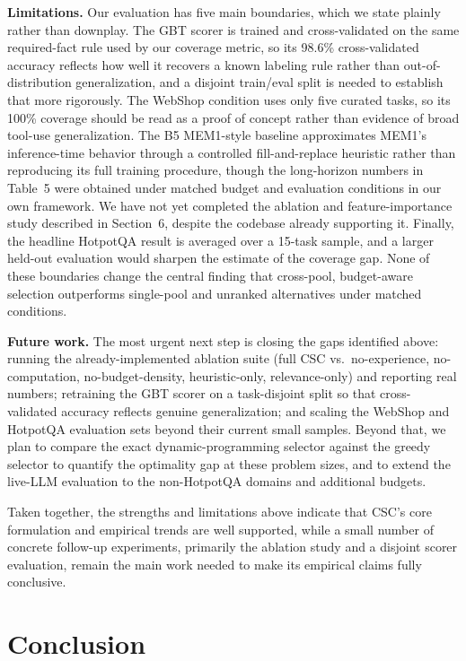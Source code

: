 \documentclass{article}
\begin{document}
\textbf{Limitations.} Our evaluation has five main boundaries, which we state plainly rather than downplay. The GBT scorer is trained and cross-validated on the same required-fact rule used by our coverage metric, so its 98.6\% cross-validated accuracy reflects how well it recovers a known labeling rule rather than out-of-distribution generalization, and a disjoint train/eval split is needed to establish that more rigorously. The WebShop condition uses only five curated tasks, so its 100\% coverage should be read as a proof of concept rather than evidence of broad tool-use generalization. The B5 MEM1-style baseline approximates MEM1's inference-time behavior through a controlled fill-and-replace heuristic rather than reproducing its full training procedure, though the long-horizon numbers in Table~5 were obtained under matched budget and evaluation conditions in our own framework. We have not yet completed the ablation and feature-importance study described in Section~6, despite the codebase already supporting it. Finally, the headline HotpotQA result is averaged over a 15-task sample, and a larger held-out evaluation would sharpen the estimate of the coverage gap. None of these boundaries change the central finding that cross-pool, budget-aware selection outperforms single-pool and unranked alternatives under matched conditions.

\textbf{Future work.} The most urgent next step is closing the gaps identified above: running the already-implemented ablation suite (full CSC vs.\ no-experience, no-computation, no-budget-density, heuristic-only, relevance-only) and reporting real numbers; retraining the GBT scorer on a task-disjoint split so that cross-validated accuracy reflects genuine generalization; and scaling the WebShop and HotpotQA evaluation sets beyond their current small samples. Beyond that, we plan to compare the exact dynamic-programming selector against the greedy selector to quantify the optimality gap at these problem sizes, and to extend the live-LLM evaluation to the non-HotpotQA domains and additional budgets.

Taken together, the strengths and limitations above indicate that CSC's core formulation and empirical trends are well supported, while a small number of concrete follow-up experiments, primarily the ablation study and a disjoint scorer evaluation, remain the main work needed to make its empirical claims fully conclusive.

\section{Conclusion}
\end{document}
